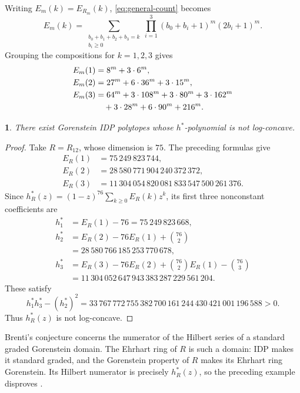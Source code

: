 \documentclass[11pt, letterpaper, english]{amsart}
\theoremstyle{teoremas}
\newcommand{\repeatedtheoremname}{}
\newtheorem*{repeatedtheorem}{\repeatedtheoremname}
\newenvironment{restate}[1]{%
  \renewcommand{\repeatedtheoremname}{Theorem~\hyperref[#1]{\ref*{#1}}}%
  \begin{repeatedtheorem}%
}{\end{repeatedtheorem}}
\theoremstyle{definition}
\begin{document}
Writing $E_m(k)=E_{R_m}(k)$, \eqref{eq:general-count} becomes
\[
 E_m(k)=\sum_{\substack{b_0+b_1+b_2+b_3=k\\b_i\ge0}}
      \prod_{i=1}^3(b_0+b_i+1)^m(2b_i+1)^m.
\]
Grouping the compositions for $k=1,2,3$ gives
\begin{align}
 E_m(1)&=8^m+3\cdot6^m,\label{eq:R-E1}\\
 E_m(2)&=27^m+6\cdot36^m+3\cdot15^m,\label{eq:R-E2}\\
 E_m(3)&=64^m+3\cdot108^m+3\cdot80^m+3\cdot162^m\notag\\
 &\quad+3\cdot28^m+6\cdot90^m+216^m.
 \label{eq:R-E3}
\end{align}


\begin{restate}{thm:main-gorenstein}
There exist Gorenstein IDP polytopes whose $h^*$-polynomial is not log-concave.
\end{restate}
\begin{proof}
Take $R=R_{12}$, whose dimension is $75$. The preceding formulas give
\begin{align*}
 E_R(1)&=75\,249\,823\,744,\\
 E_R(2)&=28\,580\,771\,904\,240\,372\,372,\\
 E_R(3)&=11\,304\,054\,820\,081\,833\,547\,500\,261\,376.
\end{align*}
Since $h_R^*(z)=(1-z)^{76}\sum_{k\ge0}E_R(k)z^k$, its first
three nonconstant coefficients are
\begin{align*}
 h_1^*&=E_R(1)-76=75\,249\,823\,668,\\
 h_2^*&=E_R(2)-76E_R(1)+\binom{76}{2}\\
      &=28\,580\,766\,185\,253\,770\,678,\\
 h_3^*&=E_R(3)-76E_R(2)+\binom{76}{2}E_R(1)-\binom{76}{3}\\
      &=11\,304\,052\,647\,943\,383\,287\,229\,561\,204.
\end{align*}
These satisfy
\[
 h_1^*h_3^*-(h_2^*)^2
 =33\,767\,772\,755\,382\,700\,161\,244\,430\,421\,001\,196\,588>0.
\]
Thus $h_R^*(z)$ is not log-concave.
\end{proof}


Brenti's conjecture concerns the numerator of the Hilbert series of a
standard graded Gorenstein domain. The Ehrhart ring of $R$ is such a
domain: IDP makes it standard graded, and the Gorenstein property of
$R$ makes its Ehrhart ring Gorenstein. Its Hilbert numerator is precisely
$h_R^*(z)$, so the preceding example disproves
\cite[Conjecture~5.2]{brenti-update}.
\end{document}
